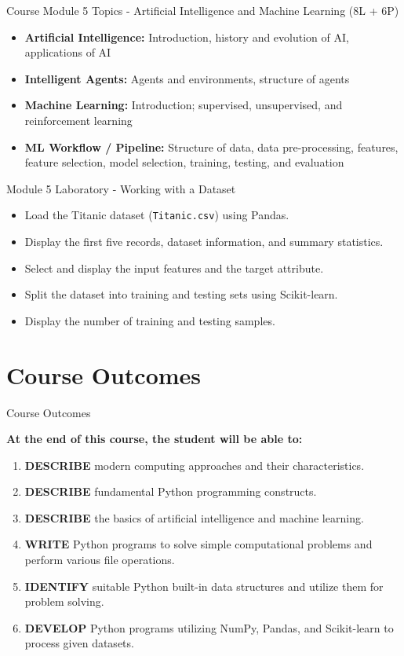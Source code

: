 \documentclass[aspectratio=169]{beamer}
\begin{document}
\begin{frame}{Course Module 5 Topics - Artificial Intelligence and Machine Learning (8L + 6P)}
\begin{itemize}
\item \textbf{Artificial Intelligence:} Introduction, history and evolution of AI, applications of AI
\item \textbf{Intelligent Agents:} Agents and environments, structure of agents
\item \textbf{Machine Learning:} Introduction; supervised, unsupervised, and reinforcement learning
\item \textbf{ML Workflow / Pipeline:} Structure of data, data pre-processing, features, feature selection, model selection, training, testing, and evaluation
\end{itemize}
\end{frame}

\begin{frame}{Module 5 Laboratory - Working with a Dataset}
\begin{itemize}
\item Load the Titanic dataset (\texttt{Titanic.csv}) using Pandas.
\item Display the first five records, dataset information, and summary statistics.
\item Select and display the input features and the target attribute.
\item Split the dataset into training and testing sets using Scikit-learn.
\item Display the number of training and testing samples.
\end{itemize}
\end{frame}

\section{Course Outcomes}
\begin{frame}{Course Outcomes}

\textbf{At the end of this course, the student will be able to:}

\vspace{0.3cm}

\begin{enumerate}
\item \textbf{DESCRIBE} modern computing approaches and their characteristics.
\item \textbf{DESCRIBE} fundamental Python programming constructs.
\item \textbf{DESCRIBE} the basics of artificial intelligence and machine learning.
\item \textbf{WRITE} Python programs to solve simple computational problems and perform various file operations.
\item \textbf{IDENTIFY} suitable Python built-in data structures and utilize them for problem solving.
\item \textbf{DEVELOP} Python programs utilizing NumPy, Pandas, and Scikit-learn to process given datasets.
\end{enumerate}

\end{frame}
\end{document}
